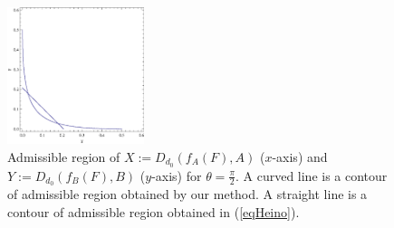 \documentclass[showpacs,preprintnumbers,amsmath,amssymb]{revtex4}
\begin{document}
\begin{figure}[thbp]
\begin{center}
 \includegraphics[width=40mm]{uncertain-1}
\end{center}
 \caption{ \label{fig:one}
 Admissible region of $X:=D_{d_0}(f_A(F),A)$ ($x$-axis) and 
 $Y:=D_{d_0}(f_B(F),B)$ ($y$-axis) for $\theta=\frac{\pi}{2}$. 
 A curved line is a contour of admissible region 
 obtained by our method. A straight line is a contour of 
 admissible region obtained in (\ref{eqHeino}).
 }
\end{figure}
\end{document}

